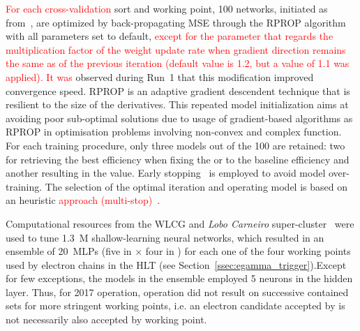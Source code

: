 \textcolor{red}{For each cross-validation} sort and working point, 100 networks, initiated
as from~\cite{initnw}, are optimized by back-propagating MSE through the RPROP
algorithm~\cite{rprop} with all parameters set to default,
\textcolor{red}{except for the parameter that regards the multiplication factor of the weight update rate when gradient direction remains the same as of the previous iteration (default value is 1.2, but a value of 1.1 was applied). It was }
observed during Run~1 that this modification improved convergence speed. RPROP
is an adaptive gradient descendent technique that is resilient to the size of
the derivatives. This repeated model initialization aims at
avoiding poor sub-optimal solutions due to usage of gradient-based algorithms as
RPROP in optimisation problems involving non-convex and complex function.
For each training procedure, only three models out of the 100 are retained: two
for retrieving the best efficiency when fixing the \pd{} or \pf{} to the
baseline \fastcalo{} efficiency and another resulting in the \spmax{} value.
Early stopping~\cite{haykin_2008} is employed to avoid model over-training. The
selection of the optimal iteration and operating model is based on an heuristic \textcolor{red}{approach (multi-stop)~\cite{Goodfellow2016}}.


Computational resources from the WLCG and \emph{Lobo Carneiro}
super-cluster~\cite{lobo_carneiro} were used to tune 1.3~M shallow-learning
neural networks, which resulted in an ensemble of \SI{20}{MLPs} (five in \et{}
$\times$ four in \abseta{})  for each one of the four working points used by
electron chains in the HLT (see Section~\ref{ssec:egamma_trigger}).\@ Except 
for few exceptions, the models in the ensemble employed 5 neurons in the 
hidden layer.  Thus, for 2017 operation, 
\rnn{} operation did not result on
successive contained sets for more stringent working points, i.e. an electron
candidate accepted by \medium{} is not necessarily also accepted by \loose{}
working point. %


